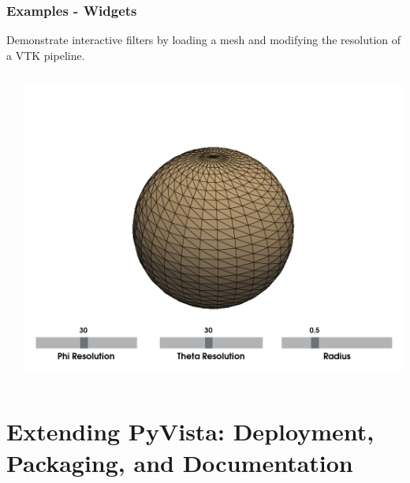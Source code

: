 \documentclass[t]{beamer}
\renewcommand{\footnotesize}{\scriptsize}
\begin{document}
\begin{frame}
    \frametitle{Examples - Widgets}

    Demonstrate interactive filters by loading a mesh and modifying the resolution of a VTK pipeline.

    \begin{center}
        \begin{columns}[T]
            \begin{column}{.4\textwidth}
                \inputminted[fontsize=\footnotesize]{python}{code/widgets_ex.py}
            \end{column}

            \begin{column}{.6\textwidth}
                \centering
                \includegraphics[width=1.0\textwidth]{figures/sphx_glr_d_multi-slider-widget_001_trans.png}
            \end{column}
        \end{columns}
    \end{center}

\end{frame}

\section{Extending PyVista: Deployment, Packaging, and Documentation}

\end{document}
